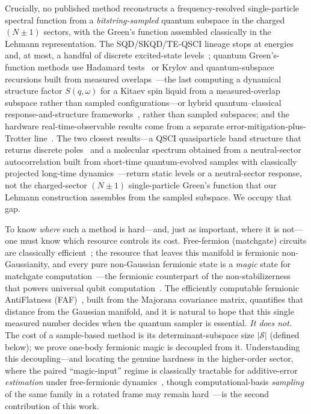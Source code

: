 Crucially, no published method reconstructs a frequency-resolved single-particle spectral function from
a \emph{bitstring-sampled} quantum subspace in the charged $(N{\pm}1)$ sectors, with the Green's function
assembled classically in the Lehmann representation. The SQD/SKQD/TE-QSCI
lineage stops at energies and, at most, a handful of discrete excited-state
levels~\cite{extsqd2025,teqsci2024}; quantum Green's-function methods use Hadamard
tests~\cite{bauer2016,endo2020} or Krylov and quantum-subspace recursions
built from measured overlaps~\cite{mcclean2017qse,rungger2020,cortesgray2022,parrish2019,onqse2024,umeano2025}---the
last computing a dynamical structure factor $S(q,\omega)$ for a Kitaev spin liquid from a measured-overlap
subspace rather than sampled configurations---or hybrid quantum--classical response-and-structure
frameworks~\cite{du2026}, rather than sampled subspaces; and
the hardware real-time-observable results come from a separate
error-mitigation-plus-Trotter line~\cite{qedma2026,algorithmiq2026,quantinuum_dsf2026}. The two
closest results---a QSCI quasiparticle band structure that returns discrete
poles~\cite{ohgoe2025} and a molecular spectrum obtained from a neutral-sector autocorrelation built from
short-time quantum-evolved samples with classically projected long-time dynamics~\cite{santini2025}---return
static levels or a neutral-sector response, not the charged-sector $(N{\pm}1)$ single-particle Green's
function that our Lehmann construction assembles from the sampled subspace. We occupy that gap.

To know \emph{where} such a method is hard---and, just as important, where it is not---one must know
which resource controls its cost. Free-fermion (matchgate) circuits are classically
efficient~\cite{valiant2002,terhaldivincenzo2002,bravyi2005flo,jozsamiyake2008}; the resource that
leaves this manifold is fermionic non-Gaussianity, and every pure non-Gaussian fermionic state is a
\emph{magic} state for matchgate computation~\cite{hebenstreit2019}---the fermionic counterpart of the
non-stabilizerness that powers universal qubit computation~\cite{bravyikitaev2005,leone2022sre}. The
efficiently computable fermionic AntiFlatness (FAF)~\cite{sierant2026}, built from the Majorana
covariance matrix, quantifies that distance from the Gaussian manifold, and it is natural to hope that
this single measured number decides when the quantum sampler is essential. \emph{It does not.} The
cost of a sample-based method is its determinant-subspace size $|\mathcal S|$ (defined below); we prove
one-body fermionic magic is decoupled from it. Understanding this
decoupling---and locating the genuine hardness in the higher-order sector, where the paired
``magic-input'' regime is classically tractable for additive-error \emph{estimation} under
free-fermionic dynamics~\cite{oh2026}, though computational-basis \emph{sampling} of the same family in
a rotated frame may remain hard~\cite{fermionsampling2022}---is the second contribution of this work.

